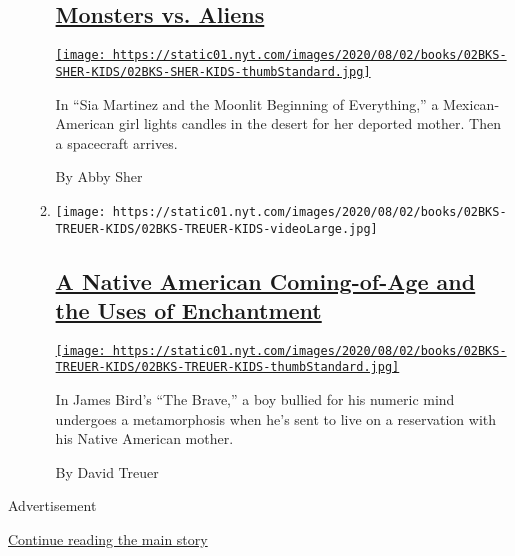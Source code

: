 \begin{enumerate}
\begin{enumerate}
    \hypertarget{monsters-vs-aliens}{%
    \subsection{\texorpdfstring{\href{/2020/07/31/books/review/sia-martinez-and-the-moonlit-beginning-of-everything-raquel-vasquez-gilliland.html}{Monsters
    vs. Aliens}}{Monsters vs. Aliens}}\label{monsters-vs-aliens}}

    \href{/2020/07/31/books/review/sia-martinez-and-the-moonlit-beginning-of-everything-raquel-vasquez-gilliland.html}{\texttt{[image: https://static01.nyt.com/images/2020/08/02/books/02BKS-SHER-KIDS/02BKS-SHER-KIDS-thumbStandard.jpg]}}

    In ``Sia Martinez and the Moonlit Beginning of Everything,'' a
    Mexican-American girl lights candles in the desert for her deported
    mother. Then a spacecraft arrives.

    By Abby Sher
  \item
    \texttt{[image: https://static01.nyt.com/images/2020/08/02/books/02BKS-TREUER-KIDS/02BKS-TREUER-KIDS-videoLarge.jpg]}

    \hypertarget{a-native-american-coming-of-age-and-the-uses-of-enchantment}{%
    \subsection{\texorpdfstring{\href{/2020/07/31/books/review/the-brave-james-bird.html}{A
    Native American Coming-of-Age and the Uses of
    Enchantment}}{A Native American Coming-of-Age and the Uses of Enchantment}}\label{a-native-american-coming-of-age-and-the-uses-of-enchantment}}

    \href{/2020/07/31/books/review/the-brave-james-bird.html}{\texttt{[image: https://static01.nyt.com/images/2020/08/02/books/02BKS-TREUER-KIDS/02BKS-TREUER-KIDS-thumbStandard.jpg]}}

    In James Bird's ``The Brave,'' a boy bullied for his numeric mind
    undergoes a metamorphosis when he's sent to live on a reservation
    with his Native American mother.

    By David Treuer
  \end{enumerate}
\end{enumerate}

Advertisement

\protect\hyperlink{after-mid1}{Continue reading the main story}

\subsection{\texorpdfstring{\protect\hyperlink{}{}}{}}

